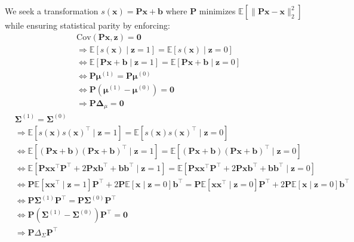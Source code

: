\documentclass[ecta,nameyear,final]{econsocart}
\numberwithin{equation}{section}
\theoremstyle{plain}
\theoremstyle{definition}
\begin{document}
\begin{appendix}
We seek a transformation $s(\mathbf{x}) = \mathbf{P}\mathbf{x} + \mathbf{b}$ where $\mathbf{\mathbf{P}}$ minimizes $\mathbb{E}\left[ \| \mathbf{P}\mathbf{x} - \mathbf{x} \|^2_{2} \right]$ while ensuring statistical parity by enforcing:
\begin{align*}
    &\text{Cov}(\mathbf{P}\mathbf{x},\mathbf{z}) = \mathbf{0} \\ &\Rightarrow \mathbb{E}[s(\mathbf{x}) \mid \mathbf{z} = 1] = \mathbb{E}[s(\mathbf{x}) \mid \mathbf{z} = 0]  \\ &\Leftrightarrow \mathbb{E}[\mathbf{P}\mathbf{x} + \mathbf{b} \mid \mathbf{z}=1]=\mathbb{E}[\mathbf{P}\mathbf{x} + \mathbf{b} \mid \mathbf{z}=0] \\ &\Leftrightarrow \mathbf{\mathbf{P}}\boldsymbol{\mu}^{(1)} = \mathbf{\mathbf{P}}\boldsymbol{\mu}^{(0)} \\ &\Leftrightarrow \mathbf{\mathbf{P}}(\boldsymbol{\mu}^{(1)} - \boldsymbol{\mu}^{(0)}) = \mathbf{0} \\ &\Rightarrow \mathbf{\mathbf{P}}\boldsymbol{\Delta}_{\mu} = \mathbf{0}
\end{align*}
\begin{align*}
    &\boldsymbol{\Sigma}^{(1)} = \boldsymbol{\Sigma}^{(0)}\\ 
    &\Rightarrow \mathbb{E}[s(\mathbf{x})s(\mathbf{x})^{\top} \mid \mathbf{z} = 1] = \mathbb{E}[s(\mathbf{x})s(\mathbf{x})^{\top} \mid \mathbf{z} = 0 ] \\ 
    &\Leftrightarrow \mathbb{E}[(\mathbf{P}\mathbf{x}+\mathbf{b})(\mathbf{P}\mathbf{x}+\mathbf{b})^{\top} \mid \mathbf{z} = 1] = \mathbb{E}[(\mathbf{P}\mathbf{x}+\mathbf{b})(\mathbf{P}\mathbf{x}+\mathbf{b})^{\top} \mid \mathbf{z} = 0] \\ 
    &\Leftrightarrow \mathbb{E}[\mathbf{P}\mathbf{x}\mathbf{x}^{\top}\mathbf{\mathbf{P}}^{\top} + 2\mathbf{P}\mathbf{x}\mathbf{b}^{\top} + \mathbf{b}\mathbf{b}^{\top} \mid \mathbf{z} = 1] = \mathbb{E}[\mathbf{P}\mathbf{x}\mathbf{x}^{\top}\mathbf{\mathbf{P}}^{\top} + 2\mathbf{P}\mathbf{x}\mathbf{b}^{\top} + \mathbf{b}\mathbf{b}^{\top} \mid \mathbf{z} = 0] \\ 
    &\Leftrightarrow \mathbf{\mathbf{P}}\mathbb{E}[\mathbf{x}\mathbf{x}^{\top} \mid \mathbf{z} =1]\mathbf{\mathbf{P}}^{\top} + 2\mathbf{P}\mathbb{E}[\mathbf{x} \mid \mathbf{z} = 0]\mathbf{b}^{\top} = \mathbf{\mathbf{P}}\mathbb{E}[\mathbf{x}\mathbf{x}^{\top} \mid \mathbf{z} =0]\mathbf{\mathbf{P}}^{\top} + 2\mathbf{P}\mathbb{E}[\mathbf{x} \mid \mathbf{z} = 0]\mathbf{b}^{\top} \\ 
    &\Leftrightarrow \mathbf{\mathbf{P}}\boldsymbol{\Sigma}^{(1)}\mathbf{\mathbf{P}}^{\top} = \mathbf{\mathbf{P}}\boldsymbol{\Sigma}^{(0)}\mathbf{\mathbf{P}}^{\top} \\ 
    &\Leftrightarrow \mathbf{\mathbf{P}}(\boldsymbol{\Sigma}^{(1)} - \boldsymbol{\Sigma}^{(0)})\mathbf{\mathbf{P}}^{\top} = \mathbf{0}  \\ 
    &\Rightarrow \mathbf{\mathbf{P}}\Delta_{\Sigma}\mathbf{\mathbf{P}}^{\top}
\end{align*}


\end{appendix}
\end{document}
